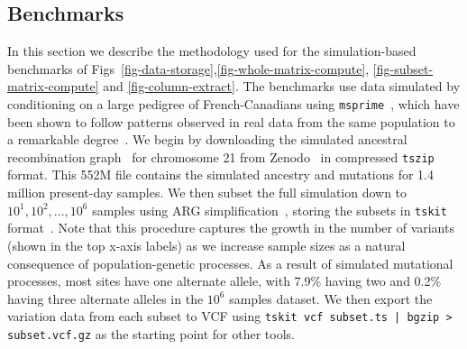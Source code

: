 \documentclass[a4paper,num-refs]{oup-contemporary}
\begin{document}
\subsection{Benchmarks}
In this section we describe the methodology used for the simulation-based
benchmarks of Figs~\ref{fig-data-storage},\ref{fig-whole-matrix-compute},
\ref{fig-subset-matrix-compute} and \ref{fig-column-extract}.
The benchmarks use data simulated by conditioning on a large
pedigree of French-Canadians using 
\texttt{msprime}~\citep{baumdicker2021efficient},
which have been shown to follow patterns observed in real 
data from the same population to a remarkable 
degree~\cite{anderson2023on}.
We begin by downloading the simulated ancestral recombination 
graph~\cite{brandt2024promise,lewanski2024era,wong2024general}
for chromosome 21 from Zenodo~\cite{anderson2023simulated} 
in compressed \texttt{tszip} format. This 552M file 
contains the simulated ancestry and mutations for 1.4 million
present-day samples. We then subset the full simulation 
down to ${10^1, 10^2, \dots, 10^6}$ samples using 
ARG simplification~\cite{kelleher2018efficient,wong2024general},
storing the subsets in \texttt{tskit} format~\cite{tskit2024}.
Note that this procedure captures the growth 
in the number of variants (shown in the top x-axis labels)
as we increase sample sizes as a 
natural consequence of population-genetic processes.
As a result of simulated mutational processes,
most sites have one alternate allele, 
with 7.9\% having two and 0.2\% having three
alternate alleles in the $10^6$ samples dataset.
We then export the variation data from each subset to VCF
using \texttt{tskit vcf subset.ts | bgzip > subset.vcf.gz}
as the starting point for other tools.
\end{document}
